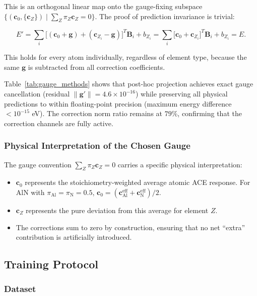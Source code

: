 \documentclass[twoside,prb,aps,floatfix,superscriptaddress,longbibliography]{revtex4-2}
\begin{document}
This is an orthogonal linear map onto the gauge-fixing subspace $\{(\mathbf{c}_0, \{\mathbf{c}_Z\}) \mid \sum_Z \pi_Z \mathbf{c}_Z = 0\}$. The proof of prediction invariance is trivial:

\begin{equation}
E' = \sum_i \big[ (\mathbf{c}_0 + \mathbf{g}) + (\mathbf{c}_{Z_i} - \mathbf{g}) \big]^T \mathbf{B}_i + b_{Z_i}
    = \sum_i \big[ \mathbf{c}_0 + \mathbf{c}_{Z_i} \big]^T \mathbf{B}_i + b_{Z_i}
    = E.
\label{eq:projection_invariance}
\end{equation}

This holds for every atom individually, regardless of element type, because the same $\mathbf{g}$ is subtracted from all correction coefficients.

Table~\ref{tab:gauge_methods} shows that post-hoc projection achieves exact gauge cancellation (residual $\lVert\mathbf{g}'\rVert = 4.6 \times 10^{-16}$) while preserving all physical predictions to within floating-point precision (maximum energy difference $< 10^{-15}$ eV). The correction norm ratio remains at $79\%$, confirming that the correction channels are fully active.

\subsubsection{Physical Interpretation of the Chosen Gauge}

The gauge convention $\sum_Z \pi_Z \mathbf{c}_Z = 0$ carries a specific physical interpretation:
\begin{itemize}
    \item $\mathbf{c}_0$ represents the stoichiometry-weighted average atomic ACE response. For AlN with $\pi_{\mathrm{Al}} = \pi_{\mathrm{N}} = 0.5$, $\mathbf{c}_0 = (\mathbf{c}_{\mathrm{Al}}^{\mathrm{eff}} + \mathbf{c}_{\mathrm{N}}^{\mathrm{eff}})/2$.
    \item $\mathbf{c}_Z$ represents the pure deviation from this average for element $Z$.
    \item The corrections sum to zero by construction, ensuring that no net ``extra'' contribution is artificially introduced.
\end{itemize}

\subsection{Training Protocol}
\label{sec:training}

\subsubsection{Dataset}
\end{document}
